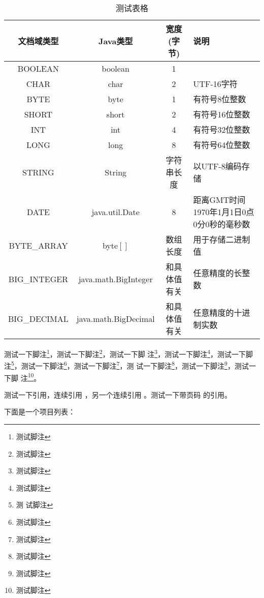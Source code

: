 \begin{table}
        \centering
        \begin{tabular}{cccp{38mm}}
            \toprule
            \textbf{文档域类型} & \textbf{Java类型} & \textbf{宽度(字节)} & \textbf{说明} \\
            \midrule
            BOOLEAN  & boolean &  1  & \\
            CHAR     & char    &  2  & UTF-16字符 \\
            BYTE     & byte    &  1  & 有符号8位整数 \\
            SHORT    & short   &  2  & 有符号16位整数 \\
            INT      & int     &  4  & 有符号32位整数 \\
            LONG     & long    &  8  & 有符号64位整数 \\
            STRING   & String  &  字符串长度  & 以UTF-8编码存储 \\
            DATE     & java.util.Date & 8 & 距离GMT时间1970年1月1日0点0分0秒的毫秒数 \\
            BYTE\_ARRAY & byte$[]$ & 数组长度 & 用于存储二进制值 \\
            BIG\_INTEGER & java.math.BigInteger & 和具体值有关 & 任意精度的长整数 \\
            BIG\_DECIMAL & java.math.BigDecimal & 和具体值有关 & 任意精度的十进制实数 \\
            \bottomrule
        \end{tabular}
        \caption{测试表格}\label{table:test1}
    \end{table}



测试一下脚注\footnote{测试脚注}，测试一下脚注\footnote{测试脚注}，测试一下脚
注\footnote{测试脚注}，测试一下脚注\footnote{测试脚注}，测试一下脚注\footnote{测
    试脚注}，测试一下脚注\footnote{测试脚注}，测试一下脚注\footnote{测试脚注}，测
试一下脚注\footnote{测试脚注}，测试一下脚注\footnote{测试脚注}，测试一下脚
注\footnote{测试脚注}。

测试一下引用\cite{newman2006structure}，连续引用
\cite{newman2001random,aiello2000random,bollobas2001random}，另一个连续引用
\cite{newman2001random,bollobas2001random,barabasi1999emergence}。测试一下带页码
的引用\cite[124--128]{erdHos1961strength}。

下面是一个项目列表：


